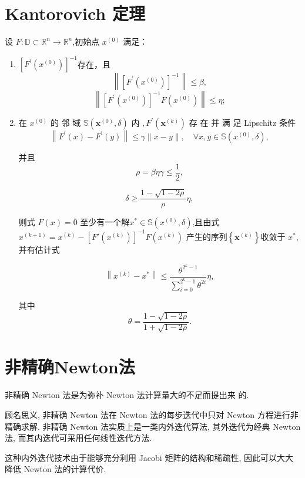 \documentclass{lzureport}
\begin{document}
\section{Kantorovich 定理}
设 $F:\mathbb{D}\subset\mathbb{R}^n\to\mathbb{R}^n$,初始点 $x^(0)$
满足：
\begin{enumerate}[itemindent=1em,label=\arabic*)]	
	\item $\left[F^{\prime}\left(x^{(0)}\right)\right]^{-1}$存在，且
	$$\left\|\left[F^{\prime}\left(x^{(0)}\right)\right]^{-1}\right\|\leqslant\beta,$$
	$$\left\|\left[F^{\prime}\left(x^{(0)}\right)\right]^{-1}F\left(x^{(0)}\right)\right\|\leqslant\eta;$$

	\item 在  $x^{( 0) }$ 的 邻 域  $\mathbb{S} \left ( \boldsymbol{x}^{( 0) }, \delta \right )$ 内 $, F^{\prime }\left ( \boldsymbol{x}^{( k) }\right )$ 存 在 并 满 足  Lipschitz 条件
	$$\left\|F^{\prime}(x)-F^{\prime}(y)\right\|\leqslant\gamma\|x-y\|,\quad\forall x,y\in\mathbb{S}\left(x^{(0)},\delta\right),$$
	
	并且
	$$\rho=\beta\eta\gamma\leqslant\frac12,$$
	
	$$\delta\geqslant\frac{1-\sqrt{1-2\rho}}\rho\eta,$$
	
	
	则式 $F(x)=0$ 至少有一个解$x^*\in\mathbb{S}\left(x^{(0)},\delta\right)$,且由式 $x^{(k+1)} = x^{(k)} - [F'(x^{(k)})]^{-1}F(x^{(k)}) $ 产生的序列$\left\{\boldsymbol{x}^{(k)}\right\}$收敛于 $x^*$,并有估计式
	
	$$\left\|x^{(k)}-x^*\right\|\leqslant\frac{\theta^{2^k-1}}{\sum\limits_{i=0}^{2^k-1}\theta^{2i}}\eta,$$
	
	其中 $$\theta=\frac{1-\sqrt{1-2\rho}}{1+\sqrt{1-2\rho}}.$$
\end{enumerate}

\section{非精确Newton法}
非精确 Newton 法是为弥补 Newton 法计算量大的不足而提出来
的. 

顾名思义, 非精确 Newton 法在 Newton 法的每步迭代中只对 Newton 方程进行非精确求解. 
非精确 Newton 法实质上是一类内外迭代算法, 其外迭代为经典 Newton 法, 
而其内迭代可采用任何线性迭代方法.

这种内外迭代技术由于能够充分利用 Jacobi 矩阵的结构和稀疏性, 
因此可以大大降低 Newton 法的计算代价. 
\end{document}
